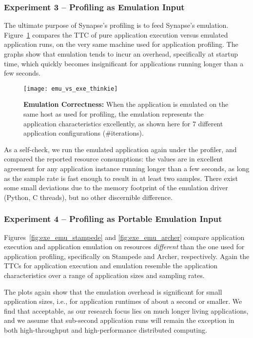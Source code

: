 \documentclass[10pt, conference, compsocconf]{IEEEtran}
\newcommand{\I}[1]{\textit{#1}\xspace}
\newcommand{\synapse}{Synapse\xspace}
\begin{document}
 \subsubsection*{Experiment 3 -- Profiling as Emulation Input}

 The ultimate purpose of \synapse's profiling is to feed \synapse's
 emulation.  Figure~\ref{fig:exe_emu_thinkie} compares the TTC of pure
 application execution versus emulated application runs, on the very
 same machine used for application profiling.  The graphs show that
 emulation tends to incur an overhead, specifically at startup time,
 which quickly becomes insignificant for applications running
 longer than a few seconds.

 \begin{figure}[t]
   \centering
   \texttt{[image: emu\_vs\_exe\_thinkie]}
   \caption{\textbf{Emulation Correctness:} When the application is emulated on
     the same host as used for profiling, the emulation represents the
     application characteristics excellently, as shown here for 7
     different application configurations (\#iterations).
     \label{fig:exe_emu_thinkie} 
   } 
   \end{figure}

 As a self-check, we run the emulated application again under the
 profiler, and compared the reported resource consumptions: the values
 are in excellent agreement for any application instance running
 longer than a few seconds, as long as the sample rate is fast enough
 to result in at least two samples.  There exist some small deviations
 due to the memory footprint of the emulation driver (Python, C
 threads), but no other discernible difference.

 \subsubsection*{Experiment 4 -- Profiling as Portable Emulation Input}

 Figures~\ref{fig:exe_emu_stampede} and \ref{fig:exe_emu_archer}
 compare application execution and application emulation on resources
 \I{different} than the one used for application profiling,
 specifically on Stampede and Archer, respectively.  Again the TTCs
 for application execution and emulation resemble the application
 characteristics over a range of application sizes and sampling rates.

 The plots again show that the emulation overhead is significant for
 small application sizes, i.e., for application runtimes of about a
 second or smaller.  We find that acceptable, as our research focus
 lies on much longer living applications, and we assume that
 sub-second application runs will remain the exception in both
 high-throughput and high-performance distributed computing.
\end{document}
